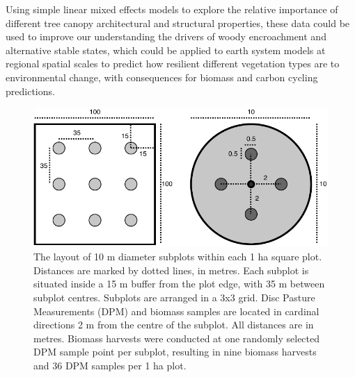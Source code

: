 \begin{refsection}
Using simple linear mixed effects models to explore the relative importance of different tree canopy architectural and structural properties, these data could be used to improve our understanding the drivers of woody encroachment and alternative stable states, which could be applied to earth system models at regional spatial scales to predict how resilient different vegetation types are to environmental change, with consequences for biomass and carbon cycling predictions.

\begin{figure}[!h]
\centering
	\includegraphics[width=\textwidth]{img/subplot}
	\caption[Grass biomass harvesting subplot layout]{The layout of 10 m diameter subplots within each 1 ha square plot. Distances are marked by dotted lines, in metres. Each subplot is situated inside a 15 m buffer from the plot edge, with 35 m between subplot centres. Subplots are arranged in a 3x3 grid. Disc Pasture Measurements (DPM) and biomass samples are located in cardinal directions 2 m from the centre of the subplot. All distances are in metres. Biomass harvests were conducted at one randomly selected DPM sample point per subplot, resulting in nine biomass harvests and 36 DPM samples per 1 ha plot.}
	\label{legacy:subplot}
\end{figure}

\newpage{}
\begingroup
{}
\printbibliography[heading=subbibintoc]
\endgroup

\end{refsection}

